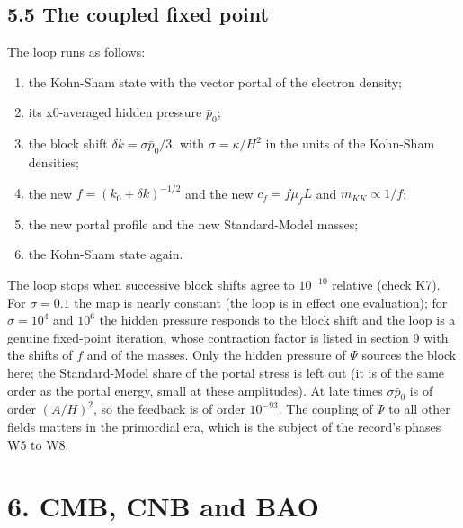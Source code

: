\documentclass[11pt]{article}
\begin{document}
\subsection*{5.5 The coupled fixed point}

The loop runs as follows:
\begin{enumerate}
\item the Kohn-Sham state with the vector portal of the electron density;
\item its x0-averaged hidden pressure $\bar p_0$;
\item the block shift $\delta k = \sigma\bar p_0/3$, with $\sigma = \kappa/H^2$ in the units of the Kohn-Sham densities;
\item the new $f = (k_0 + \delta k)^{-1/2}$ and the new $c_f = f\mu_fL$ and $m_{KK} \propto 1/f$;
\item the new portal profile and the new Standard-Model masses;
\item the Kohn-Sham state again.
\end{enumerate}

The loop stops when successive block shifts agree to $10^{-10}$ relative (check K7). For $\sigma = 0.1$ the map is nearly constant (the loop is in effect one evaluation); for $\sigma = 10^4$ and $10^6$ the hidden pressure responds to the block shift and the loop is a genuine fixed-point iteration, whose contraction factor is listed in section 9 with the shifts of $f$ and of the masses. Only the hidden pressure of $\Psi$ sources the block here; the Standard-Model share of the portal stress is left out (it is of the same order as the portal energy, small at these amplitudes). At late times $\sigma\bar p_0$ is of order $(A/H)^2$, so the feedback is of order $10^{-93}$. The coupling of $\Psi$ to all other fields matters in the primordial era, which is the subject of the record's phases W5 to W8.

\section*{6. CMB, CNB and BAO}
\end{document}
